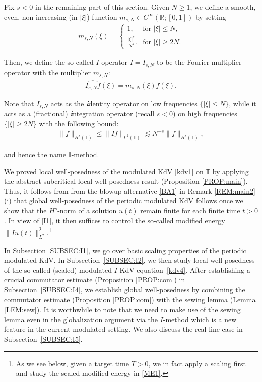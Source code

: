 \documentclass[letterpaper, 11pt,  reqno]{amsart}
\newcommand{\1}{\hspace{0.5mm}\text{I}\hspace{0.5mm}}
\newcommand{\noi}{\noindent}
\newcommand{\R}{\mathbb{R}}
\newcommand{\T}{\mathbb{T}}
\newcommand{\ft}{\widehat}
\newcommand{\bi}{\bfseries\itshape}
\newcommand{\les}{\lesssim}
\numberwithin{equation}{section}
\numberwithin{theorem}{section}
\begin{document}
Fix   $s<0$
in the remaining part of this section.
 Given $N \geq 1$,
 we define a smooth, even, 
 non-increasing (in $|\xi|$) 
 function 
 $m_{s, N} \in C^\infty(\R; [0, 1])$ 
 by setting
\begin{align}
m_{s, N}(\xi)=
\begin{cases}
1, 
&\text{for }
|\xi|\leq N,   \\
\frac{ |\xi|^s }{ N^s }.
&\text{for }
|\xi|\geq  2N.
\end{cases}
\label{Iop1}
\end{align}




\noi
Then, we define the so-called $I$-operator $I = I_{s, N}$
to be the Fourier multiplier operator with the multiplier $m_{s, N}$:
\begin{align}
\ft{I_{s, N}f}(\xi)=m_{s, N}(\xi)\ft{f}(\xi).
\label{Ix2}
\end{align}


\noi
Note that 
$I_{s, N}$ acts as the {\bi i}\hspace{0.25mm}dentity operator on low frequencies $\{ |\xi| \leq N\}$, 
while it acts as a (fractional)  
{{\bi i}\hspace{0.25mm}\nolinebreak ntegration}   operator 
(recall  $s < 0$)
 on high frequencies $\{ |\xi| \geq 2N\}$
 with the following bound:
\begin{align}
\| f \|_{H^s (\T) } \leq\| I f \|_{L^2(\T)}
\les N^{-s} \| f \|_{H^s(\T)}, 
\label{I1}
\end{align}

\noi
 and hence the name $\pmb{I}$-method.



We proved local well-posedness
of 
the modulated KdV \eqref{kdv1} on $\T$
by applying the abstract subcritical  local well-posedness
result (Proposition \ref{PROP:main}).
Thus, it follows from from the blowup alternative \eqref{BA1}
in Remark \ref{REM:main2}\,(i)
that 
global well-posedness of the periodic modulated KdV follows
once we show that the $H^s$-norm 
of a solution $u(t)$ remain finite 
for each finite time $t > 0$.
In view of \eqref{I1}, 
it then suffices to control the so-called
modified energy $\| Iu(t)\|_{L^2}^2$.\footnote{As we see below, given a target time $T> 0$, 
we in fact apply a scaling first and study the scaled modified energy in \eqref{ME1}.}


In Subsection \ref{SUBSEC:I1}, 
we go over basic scaling properties
of the periodic modulated KdV.
In Subsection~\ref{SUBSEC:I2}, 
we then study  local well-posedness
of the so-called (scaled) modulated $I$-KdV equation~\eqref{kdv4}.
After establishing a crucial commutator estimate
(Proposition \ref{PROP:com}) in Subsection~\ref{SUBSEC:I4}, 
we establish global well-posedness
by combining the commutator estimate (Proposition \ref{PROP:com})
with the sewing lemma (Lemma \ref{LEM:sew}).
It is worthwhile to note that we need to make use
of the sewing lemma even in the globalization argument via the $I$-method
which is a new feature in the current modulated setting.
We also discuss the real line case in Subsection~\ref{SUBSEC:I5}.
\end{document}
